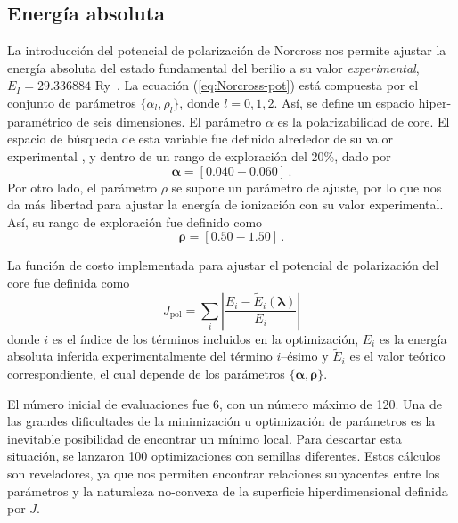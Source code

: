 \subsection{Energía absoluta}

La introducción del potencial de polarización de Norcross nos permite
ajustar la energía absoluta del estado fundamental del berilio a su valor 
\textit{experimental}, $E_I=29.336884$ Ry~\cite{NIST}. La ecuación 
(\ref{eq:Norcross-pot}) está compuesta por el conjunto de parámetros 
$\{\alpha_l,\rho_l\}$, donde $l=0,1,2$. Así, se define un espacio 
hiper-paramétrico de seis dimensiones. El parámetro $\alpha$ es la 
polarizabilidad de core. El espacio de búsqueda de esta variable fue 
definido alrededor de su valor experimental \cite{Dalgarno:62,Sitz:71},
y dentro de un rango de exploración del 20\%, dado por
\begin{equation}
\boldsymbol\alpha=[0.040-0.060]\,.
\end{equation}
Por otro lado, el parámetro $\rho$ se supone un parámetro de ajuste, por 
lo que nos da más libertad para ajustar la energía de ionización con su 
valor experimental. Así, su rango de exploración fue definido como
\begin{equation}
\boldsymbol\rho=[0.50-1.50]\,.
\end{equation}

La función de costo implementada para ajustar el potencial de 
polarización del core fue definida como
\begin{equation}
J_{\mathrm{pol}} = \sum_{i} \left|\frac{E_{i}-\tilde{E}_{i}
(\boldsymbol{\lambda})}{E_{i}} \right|
\label{eq:Jpol}
\end{equation}
donde $i$ es el índice de los términos incluidos en la optimización, 
$E_{i}$ es la energía absoluta inferida experimentalmente del 
término $i$--ésimo y $\tilde{E}_{i}$ es el valor teórico correspondiente, 
el cual depende de los parámetros $\{\boldsymbol\alpha,\boldsymbol\rho\}$.

El número inicial de evaluaciones fue 6, con un número máximo de 120. Una 
de las grandes dificultades de la minimización u optimización de 
parámetros es la inevitable posibilidad de encontrar un mínimo local. 
Para descartar esta situación, se lanzaron 100 optimizaciones con 
semillas diferentes. Estos cálculos son reveladores, ya que nos permiten 
encontrar relaciones subyacentes entre los parámetros y la naturaleza 
no-convexa de la superficie hiperdimensional definida por $J$.

